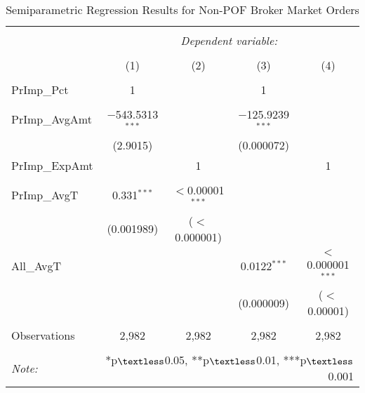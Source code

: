 \documentclass[11pt,a4paper]{article}
\begin{document}
\begin{table}[!htbp] 
	\captionsetup{font=normal}
	\caption{Semiparametric Regression Results for Non-POF Broker Market Orders} 
	\label{} 
	\centering
	\small
	\begin{tabular}{@{\extracolsep{1em}}lcccc} 
		\\[-1.8ex]\hline  
		\hline \\[-1.8ex]  
		& \multicolumn{4}{c}{\textit{Dependent variable:}} \\  
		\cline{2-5}  
		\\[-1.8ex] & (1) & (2) & (3) & (4)\\  
		\hline \\[-1.8ex]  
		PrImp\_Pct & 1 &  & 1 &  \\  
		&  &  &  &  \\  [1.5ex]
		PrImp\_AvgAmt & $-$543.5313
		$^{***}$ &  & $-$125.9239$^{***}$ &  \\  
		& (2.9015) &  & (0.000072) &  \\  [1.5ex]
		PrImp\_ExpAmt &  &1 &  & 1 \\  
		&  &  &  &  \\ [1.5ex]
		PrImp\_AvgT & 0.331$^{***}$ & $<$0.00001$^{***}$ &  &  \\  
		& (0.001989) & ($<$0.000001) &  &  \\  [1.5ex]
		All\_AvgT &  &  & 0.0122$^{***}$ & $<$0.000001$^{***}$ \\  
		&  &  & (0.000009) & ($<$0.00001) \\  [1.5ex]
		\hline \\[-1.8ex]  
		Observations & 2,982 & 2,982 & 2,982 & 2,982 \\  
		\hline  
		\hline \\[-1.8ex]  
		\textit{Note:}  & \multicolumn{4}{r}{*p$\textless$0.05, **p$\textless$0.01, ***p$\textless$0.001} \\  
	\end{tabular} 
\end{table} 

%
\pagebreak
\end{document}

